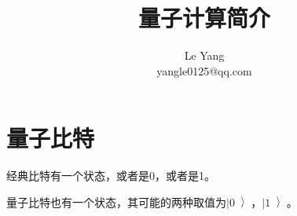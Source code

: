 \documentclass[UTF8]{ctexart}
\begin{document}
\title{量子计算简介}
\author{%
Le Yang\\
yangle0125@qq.com
}
\date{}
\maketitle



\section{量子比特}

经典比特有一个状态，或者是0，或者是1。

量子比特也有一个状态，其可能的两种取值为$\left|0\left\rangle$，$\left|1\left\rangle$。
\end{document}
